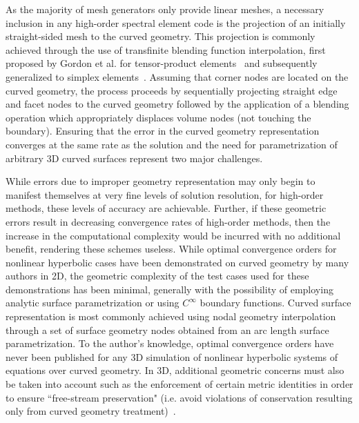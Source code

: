 \documentclass[12pt,Bold,letterpaper,TexShade]{mcgilletdclass}
\numberwithin{equation}{section}
\begin{document}
As the majority of mesh generators only provide linear meshes, a necessary inclusion in any high-order spectral element code is the projection of an initially straight-sided mesh to the curved geometry. This projection is commonly achieved through the use of transfinite blending function interpolation, first proposed by Gordon et al. for tensor-product elements~\cite{gordon1973} and subsequently generalized to simplex elements~\cite{nielson1979,haber1981,szabo1991,lacombe1988,dey1997,xie2013}. Assuming that corner nodes are located on the curved geometry, the process proceeds by sequentially projecting straight edge and facet nodes to the curved geometry followed by the application of a blending operation which appropriately displaces volume nodes (not touching the boundary). Ensuring that the error in the curved geometry representation converges at the same rate as the solution and the need for parametrization of arbitrary 3D curved surfaces represent two major challenges.

While errors due to improper geometry representation may only begin to manifest themselves at very fine levels of solution resolution, for high-order methods, these levels of accuracy are achievable. Further, if these geometric errors result in decreasing convergence rates of high-order methods, then the increase in the computational complexity would be incurred with no additional benefit, rendering these schemes useless. While optimal convergence orders for nonlinear hyperbolic cases have been demonstrated on curved geometry by many authors in 2D, the geometric complexity of the test cases used for these demonstrations has been minimal, generally with the possibility of employing analytic surface parametrization or using $C^{\infty}$ boundary functions. Curved surface representation is most commonly achieved using nodal geometry interpolation through a set of surface geometry nodes obtained from an arc length surface parametrization. To the author's knowledge, optimal convergence orders have never been published for any 3D simulation of nonlinear hyperbolic systems of equations over curved geometry. In 3D, additional geometric concerns must also be taken into account such as the enforcement of certain metric identities in order to ensure ``free-stream preservation" (i.e. avoid violations of conservation resulting only from curved geometry treatment)~\cite{kopriva2006}.
\end{document}
